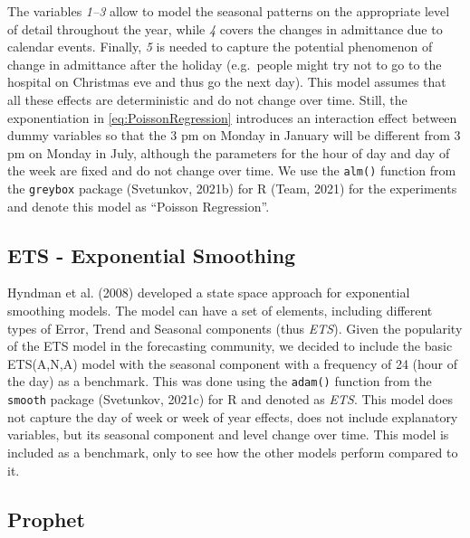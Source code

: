 \documentclass[]{elsarticle} %
\begin{document}
The variables \emph{1--3} allow to model the seasonal patterns on the
appropriate level of detail throughout the year, while \emph{4} covers the
changes in admittance due to calendar events. Finally, \emph{5} is needed to
capture the potential phenomenon of change in admittance after the
holiday (e.g.~people might try not to go to the hospital on Christmas
eve and thus go the next day). This model assumes that all these effects
are deterministic and do not change over time. Still, the exponentiation
in \eqref{eq:PoissonRegression} introduces an interaction effect between
dummy variables so that the 3 pm on Monday in January will be different
from 3 pm on Monday in July, although the parameters for the hour of day
and day of the week are fixed and do not change over time. We use the
\texttt{alm()} function from the \texttt{greybox} package (Svetunkov, 2021b) for
R (Team, 2021) for the experiments and denote this model as ``Poisson
Regression''.

\hypertarget{ets---exponential-smoothing}{%
\subsection{ETS - Exponential Smoothing}\label{ets---exponential-smoothing}}

Hyndman et al. (2008) developed a state space approach for exponential smoothing
models. The model can have a set of elements, including different types
of Error, Trend and Seasonal components (thus \emph{ETS}). Given the
popularity of the ETS model in the forecasting community, we decided to
include the basic ETS(A,N,A) model with the seasonal component with a
frequency of 24 (hour of the day) as a benchmark. This was done using
the \texttt{adam()} function from the \texttt{smooth} package (Svetunkov, 2021c)
for R and denoted as \emph{ETS}. This model does not capture the day of week
or week of year effects, does not include explanatory variables, but its
seasonal component and level change over time. This model is included as
a benchmark, only to see how the other models perform compared to it.

\hypertarget{prophet}{%
\subsection{Prophet}\label{prophet}}
\end{document}

